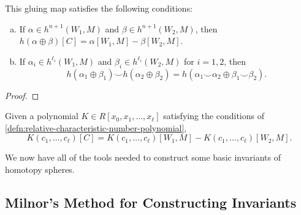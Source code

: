 \begin{proposition}\label{prop:invariant-variation-naturality}
	This gluing map satisfies the following conditions:
	\begin{enumerate}[(a)]
		\item If $\alpha\in h^{n+1}(W_1, M)$ and $\beta\in h^{n+1}(W_2,M)$, then
		      $h(\alpha\oplus \beta)[C] = \alpha[W_1, M] - \beta[W_2, M]$.
		\item If $\alpha_i\in h^{\ell_i}(W_1,M)$ and $\beta_i \in h^{\ell_i}(W_2,M)$ for $i=1,2$, then
		      \[h(\alpha_1\oplus\beta_1) \smile h(\alpha_2\oplus \beta_2) = h(\alpha_1\smile \alpha_2 \oplus \beta_1\smile \beta_2).\]
	\end{enumerate}
\end{proposition}
\begin{proof}
\end{proof}

\begin{corollary}\label{prop:relative-characteristic-number-variation}
	Given a polynomial $K\in R[x_0,x_1,\ldots, x_\ell]$ satisfying the conditions of \cref{defn:relative-characteristic-number-polynomial},
	\[
		K(c_1,\ldots, c_\ell)[C] = K(c_1,\ldots, c_\ell)[W_1, M] - K(c_1,\ldots, c_\ell)[W_2, M].
	\]
\end{corollary}

\begin{proposition}\label{prop:signature-variation}
\end{proposition}

We now have all of the tools needed to construct some basic invariants of homotopy spheres.

\subsection{Milnor's Method for Constructing Invariants}


